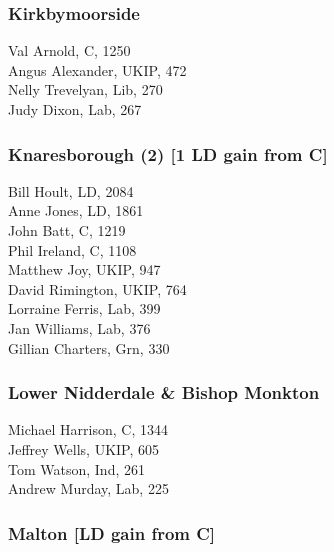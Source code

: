 \documentclass[a4paper,openany,10pt]{book}
\begin{document}
\subsubsection*{Kirkbymoorside}



Val Arnold, C, 1250\\
Angus Alexander, UKIP, 472\\
Nelly Trevelyan, Lib, 270\\
Judy Dixon, Lab, 267\\


\subsubsection*{Knaresborough (2) \hspace*{\fill}\nolinebreak[1]%
\enspace\hspace*{\fill}
[1 LD gain from C]}



Bill Hoult, LD, 2084\\
Anne Jones, LD, 1861\\
John Batt, C, 1219\\
Phil Ireland, C, 1108\\
Matthew Joy, UKIP, 947\\
David Rimington, UKIP, 764\\
Lorraine Ferris, Lab, 399\\
Jan Williams, Lab, 376\\
Gillian Charters, Grn, 330\\


\subsubsection*{Lower Nidderdale \& Bishop Monkton}



Michael Harrison, C, 1344\\
Jeffrey Wells, UKIP, 605\\
Tom Watson, Ind, 261\\
Andrew Murday, Lab, 225\\


\subsubsection*{Malton \hspace*{\fill}\nolinebreak[1]%
\enspace\hspace*{\fill}
[LD gain from C]}
\end{document}
